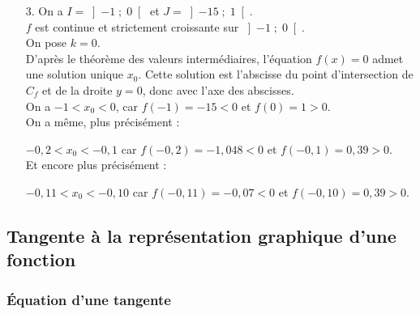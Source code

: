 \begin{itemize}
On a $0 < x_1 < 1$, car l'image de $0$ $f(0) = 1$ est $< 3$ et l'image de $1$ $f(1) = 5$ est $> 3$. \\
$x_2 = 2$. \\
$3 < x_3 < 4$, car l'image de $3$ $f(3) = 1$ est $< 3$ et l'image de $4$ $f(4) = 5$ est $> 3$. \\

On a même, plus précisément : 

$0,2 < x_1 < 0,3$ car $f(0,2) < 3 < f(0,3)$. \\
$x_2 = 2$. \\
$3,7 < x_3 < 3,8$ car $f(3,7) < 3 < f(3,8)$. \\

\item[3.] On a $I = \left]-1 \; ; \; 0\right[$ et $J = \left]-15 \; ; \; 1\right[$. \\
$f$ est continue et strictement croissante sur $\left]-1 \; ; \; 0\right[$. \\
On pose $k = 0$. \\
D'après le théorème des valeurs intermédiaires, l'équation $f(x) = 0$ admet une solution unique $x_0$. Cette solution est l'abscisse du point d'intersection de $C_f$ et de la droite $y = 0$, donc avec l'axe des abscisses. \\

On a $-1 < x_0 < 0$, car $f(-1) = -15 < 0$ et $f(0) = 1 > 0$. \\

On a même, plus précisément : 

$-0,2 < x_0 < -0,1$ car $f(-0,2) = -1,048 < 0$ et $f(-0,1) = 0,39 > 0$. \\

Et encore plus précisément : 

$-0,11 < x_0 < -0,10$ car $f(-0,11) = -0,07 < 0$ et $f(-0,10) = 0,39 > 0$.


\end{itemize}

\vspace*{-5cm}

\newpage

\vspace*{-2cm}

\subsection{Tangente à la représentation graphique d'une fonction}

\subsubsection{Équation d'une tangente}

